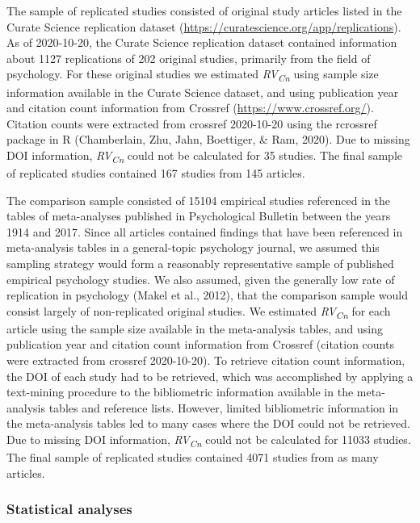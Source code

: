 \documentclass[
  english,
  jou,floatsintext]{apa6}
\begin{document}
The sample of replicated studies consisted of original study articles listed in the Curate Science replication dataset (\url{https://curatescience.org/app/replications}). As of 2020-10-20, the Curate Science replication dataset contained information about 1127 replications of 202 original studies, primarily from the field of psychology. For these original studies we estimated \emph{RV\textsubscript{Cn}} using sample size information available in the Curate Science dataset, and using publication year and citation count information from Crossref (\url{https://www.crossref.org/}). Citation counts were extracted from crossref 2020-10-20 using the rcrossref package in R (Chamberlain, Zhu, Jahn, Boettiger, \& Ram, 2020). Due to missing DOI information, \emph{RV\textsubscript{Cn}} could not be calculated for 35 studies. The final sample of replicated studies contained 167 studies from 145 articles.

The comparison sample consisted of 15104 empirical studies referenced in the tables of meta-analyses published in Psychological Bulletin between the years 1914 and 2017. Since all articles contained findings that have been referenced in meta-analysis tables in a general-topic psychology journal, we assumed this sampling strategy would form a reasonably representative sample of published empirical psychology studies. We also assumed, given the generally low rate of replication in psychology (Makel et al., 2012), that the comparison sample would consist largely of non-replicated original studies. We estimated \emph{RV\textsubscript{Cn}} for each article using the sample size available in the meta-analysis tables, and using publication year and citation count information from Crossref (citation counts were extracted from crossref 2020-10-20). To retrieve citation count information, the DOI of each study had to be retrieved, which was accomplished by applying a text-mining procedure to the bibliometric information available in the meta-analysis tables and reference lists. However, limited bibliometric information in the meta-analysis tables led to many cases where the DOI could not be retrieved. Due to missing DOI information, \emph{RV\textsubscript{Cn}} could not be calculated for 11033 studies. The final sample of replicated studies contained 4071 studies from as many articles.\\

\hypertarget{statistical-analyses}{%
\subsubsection{Statistical analyses}\label{statistical-analyses}}
\end{document}
